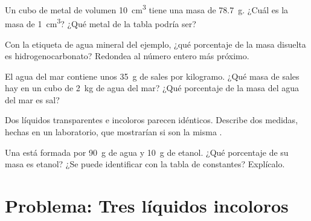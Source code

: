 \begin{exercise}[$\star\star$]\label{exo:g6:pure-substances-and-mixtures:8}
Un cubo de metal de volumen \qty{10}{cm^3} tiene una masa de
\qty{78.7}{g}. ¿Cuál es la masa de \qty{1}{cm^3}? ¿Qué metal de la
tabla podría ser?
\end{exercise}

\begin{exercise}[$\star\star$]\label{exo:g6:pure-substances-and-mixtures:9}
Con la etiqueta de agua mineral del ejemplo, ¿qué porcentaje de la masa
disuelta es hidrogenocarbonato? Redondea al número entero más próximo.
\end{exercise}

\begin{exercise}[$\star\star$]\label{exo:g6:pure-substances-and-mixtures:10}
El agua del mar contiene unos \qty{35}{g} de sales por kilogramo. ¿Qué
masa de sales hay en un cubo de \qty{2}{kg} de agua del mar? ¿Qué
porcentaje de la masa del agua del mar es sal?
\end{exercise}

\begin{exercise}[$\star\star\star$]\label{exo:g6:pure-substances-and-mixtures:11}
Dos líquidos transparentes e incoloros parecen idénticos. Describe dos
medidas, hechas en un laboratorio, que mostrarían si son la misma
.
\end{exercise}

\begin{exercise}[$\star\star\star$]\label{exo:g6:pure-substances-and-mixtures:12}
Una  está formada por \qty{90}{g} de agua y \qty{10}{g} de
etanol. ¿Qué porcentaje de su masa es etanol? ¿Se puede identificar con
la tabla de constantes? Explícalo.
\end{exercise}

\section{Problema: Tres líquidos incoloros}

